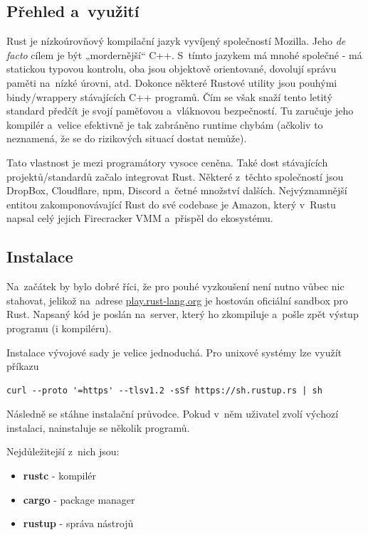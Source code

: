 \documentclass[a4paper, 12pt]{article} %
\begin{document}
    \subsection{Přehled a~využití}
        Rust je nízkoúrovňový kompilační jazyk vyvíjený společností Mozilla. Jeho \textit{de facto} cílem je být „mordernější“ C++. S~tímto jazykem má mnohé společné - má statickou typovou kontrolu, oba jsou objektově orientované, dovolují správu paměti na~nízké úrovni, atd. Dokonce některé Rustové utility jsou pouhými bindy/wrappery stávajících C++ programů. Čím se však snaží tento letitý standard předčít je svojí paměťovou a~vláknovou bezpečností. Tu zaručuje jeho kompilér a~velice efektivně je tak zabráněno runtime chybám (ačkoliv to neznamená, že se do rizikových situací dostat nemůže).

        Tato vlastnost je mezi programátory vysoce ceněna. Také dost stávajících projektů/standardů začalo integrovat Rust. Některé z~těchto společností jsou DropBox\cite{dropbox}, Cloudflare\cite{cloudflare}, npm\cite{npm}, Discord\cite{discord} a~četné množství dalších. Nejvýznamnější entitou zakomponovávající Rust do své codebase je Amazon\cite{amazon}, který v~Rustu napsal celý jejich Firecracker VMM a~přispěl do ekosystému.


    \subsection{Instalace}
        Na~začátek by bylo dobré říci, že pro pouhé vyzkoušení není nutno vůbec nic stahovat, jelikož na~adrese \href{https://play.rust-lang.org/}{play.rust-lang.org} je hostován oficiální sandbox pro Rust. Napsaný kód je poslán na~server, který ho zkompiluje a~pošle zpět výstup programu (i kompiléru).
    
        Instalace vývojové sady je velice jednoduchá. Pro unixové systémy lze využít příkazu
        \begin{verbatim}
curl --proto '=https' --tlsv1.2 -sSf https://sh.rustup.rs | sh
        \end{verbatim}
        Následně se stáhne instalační průvodce. Pokud v~něm uživatel zvolí výchozí instalaci, nainstaluje se několik programů.
        
        Nejdůležitejší z~nich jsou:
        \begin{itemize}
            \item \textbf{rustc} - kompilér
            \item \textbf{cargo} - package manager
            \item \textbf{rustup} - správa nástrojů
        \end{itemize}
\end{document}
